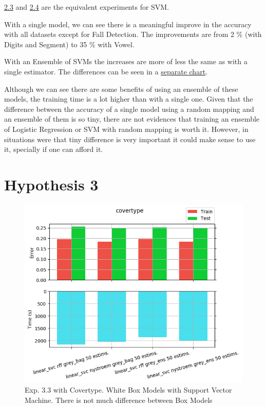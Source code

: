 \begin{pre-delivery}
\hyperref[Appendix2-3]{2.3} and \hyperref[Appendix2-4]{2.4} are the equivalent
experiments for SVM.

With a single model, we can see there is a
meaningful improve in the accuracy
with all datasets except for Fall Detection. The improvements are from 2 \%
(with Digits and Segment) to 35 \% with Vowel.

With an Ensemble of SVMs the increases are more of less the same as with a
single estimator. The differences can be seen in a \hyperref[2_4:aux]{separate
chart}.

Although we can see there are some benefits of using an ensemble of these models,
the training time is a lot higher than with a single one. Given that the
difference between the accuracy of a single model using a random mapping and
an ensemble of them is so tiny, there are not evidences that training an ensemble
of Logistic Regression or SVM with random mapping is worth it. However, in
situations were that tiny difference is very important it could make sense
to use it, specially if one can afford it.

\section*{Hypothesis 3}
\label{disc:h3}

\begin{figure}[th]
\centering
\includegraphics[scale=0.6]{Figures/3_3/covertype}
\decoRule
\caption{Exp. 3.3 with Covertype. White Box Models with Support Vector Machine. There is not much difference between Box Models}
\label{eje:3_1}
\end{figure}


\end{pre-delivery}
